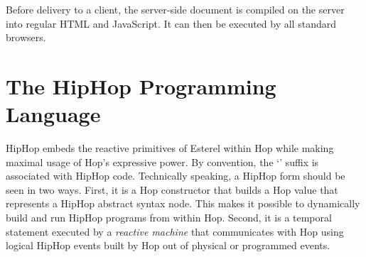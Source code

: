 \documentclass{llncs}
\begin{document}
{\footnotesize{
}}
\noindent Before delivery to a client, the server-side document is compiled on
the server into regular HTML and JavaScript. It can then be executed
by all standard browsers.

\section{The HipHop Programming Language}
\label{The HipHop Programming Language}

HipHop embeds the reactive primitives of Esterel
\cite{berry2000foundations} within Hop while making maximal usage of
Hop's expressive power.  By convention, the `{\texttt{{}}}'
suffix is associated with HipHop code.  Technically speaking, a HipHop
form should be seen in two ways. First, it is a Hop constructor that
builds a Hop value that represents a HipHop abstract syntax node. This
makes it possible to dynamically build and run HipHop programs from
within Hop. Second, it is a temporal statement executed by a {\em
  reactive machine} that communicates with Hop using logical HipHop
events built by Hop out of physical or programmed events.
\end{document}
